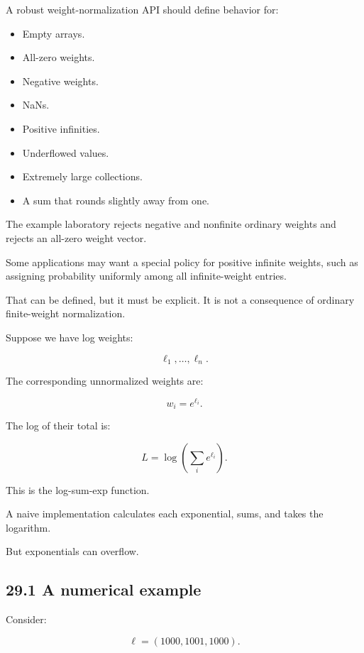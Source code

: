 \hypertarget{02-foundations-ii-ch031-reject-invalid-probability-inputs}{}

A robust weight-normalization API should define behavior for:

\begin{itemize}
\tightlist
\item
  Empty arrays.
\item
  All-zero weights.
\item
  Negative weights.
\item
  NaNs.
\item
  Positive infinities.
\item
  Underflowed values.
\item
  Extremely large collections.
\item
  A sum that rounds slightly away from one.
\end{itemize}

The example laboratory rejects negative and nonfinite ordinary weights and rejects an all-zero weight vector.

Some applications may want a special policy for positive infinite weights, such as assigning probability uniformly among all infinite-weight entries.

That can be defined, but it must be explicit. It is not a consequence of ordinary finite-weight normalization.

Suppose we have log weights:

\[ \ell_1,\ldots,\ell_n. \]

The corresponding unnormalized weights are:

\[ w_i=e^{\ell_i}. \]

The log of their total is:

\[ \boxed{ L=\log\left(\sum_ie^{\ell_i}\right) }. \]

This is the log-sum-exp function.

A naive implementation calculates each exponential, sums, and takes the logarithm.

But exponentials can overflow.

\subsection{29.1 A numerical example}\label{02-foundations-ii-ch031-a-numerical-example}

\hypertarget{02-foundations-ii-ch031-a-numerical-example}{}

Consider:

\[ \ell=(1000,1001,1000). \]

